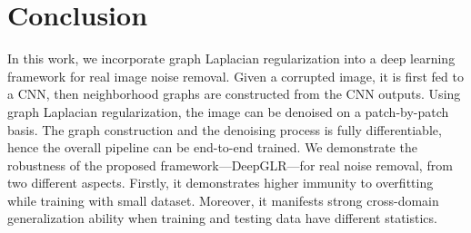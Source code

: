\documentclass[10pt,twocolumn,letterpaper]{article}
\begin{document}

\section{Conclusion}\label{sec:conclusion}
%
In this work, we incorporate graph Laplacian regularization into a deep learning framework for real image noise removal. 
Given a corrupted image, it is first fed to a CNN, then neighborhood graphs are constructed from the CNN outputs. 
Using graph Laplacian regularization, the image can be denoised on a patch-by-patch basis. 
The graph construction and the denoising process is fully differentiable, hence the overall pipeline can be end-to-end trained. 
We demonstrate the robustness of the proposed framework---DeepGLR---for real noise removal, from two different aspects.
Firstly, it demonstrates higher immunity to overfitting while training with small dataset. 
Moreover, it manifests strong cross-domain generalization ability when training and testing data have different statistics.
\end{document}
